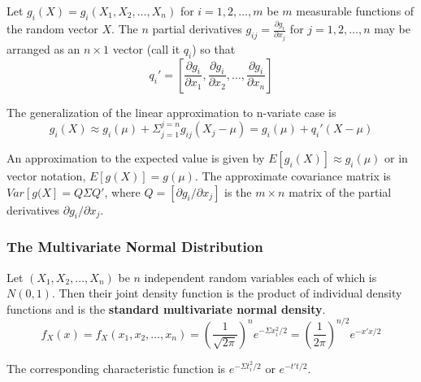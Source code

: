 \documentclass{article}
\begin{document}
Let \(g_i(X)=g_i(X_1,X_2,\dots,X_n)\) for \(i=1,2,\dots,m\) be \(m\) measurable functions of the random vector $X$. The $n$ partial derivatives \(g_{ij}=\frac{\partial g_i}{\partial x_j}\) for \(j=1,2,\dots,n\) may be arranged as an \(n \times 1\) vector (call it \(q_i\)) so that
\begin{equation*}
    q_i'=\left[\frac{\partial g_i}{\partial x_1}, \frac{\partial g_i}{\partial x_2},\dots,\frac{\partial g_i}{\partial x_n} \right]
\end{equation*}

The generalization of the linear approximation to n-variate case is
\begin{equation*}
    g_i(X) \approx g_i(\mu)+\Sigma_{j=1}^{j=n} g_{ij}(X_j-\mu) = g_i(\mu) + q_i'(X-\mu)
\end{equation*}

An approximation to the expected value is given by \(E[g_i(X)] \approx g_i(\mu)\) or in vector notation, \(E[g(X)]=g(\mu)\). The approximate covariance matrix is \(Var[g(X]=Q \Sigma Q'\), where \(Q=[\partial g_i/\partial x_j]\) is the \(m \times n\) matrix of the partial derivatives \(\partial g_i/\partial x_j\).

\subsubsection{The Multivariate Normal Distribution}

Let \((X_1,X_2,\dots,X_n)\) be \(n\) independent random variables each of which is \(N(0,1)\). Then their joint density function is the product of individual density functions and is the \textbf{standard multivariate normal density}.
\begin{equation*}
    f_X(x)=f_X(x_1,x_2,\dots,x_n)=\left(\frac{1}{\sqrt{2\pi}} \right)^n e^{-\Sigma x_i^2/2}=\left(\frac{1}{2\pi}\right)^{n/2} e^{-x'x/2}
\end{equation*}

The corresponding characteristic function is \(e^{-\Sigma t_i^2/2}\) or \(e^{-t't/2}\).
\end{document}
